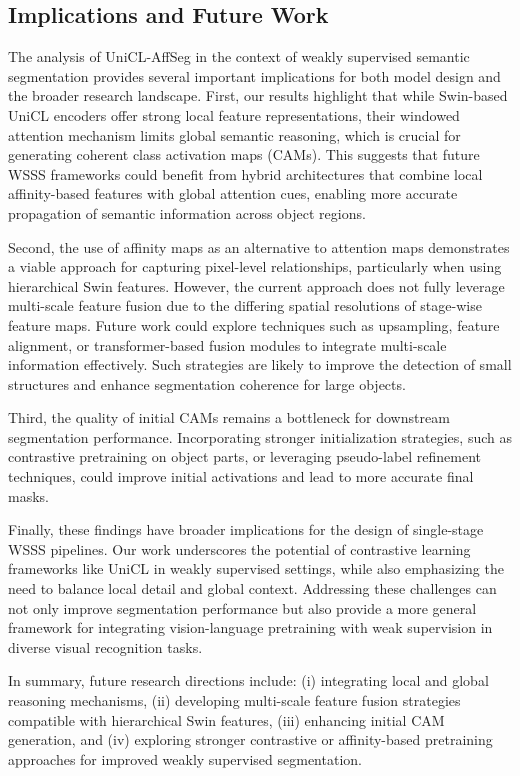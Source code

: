
\subsection{Implications and Future Work}
\label{subsec:implications_and_future_work}
The analysis of UniCL-AffSeg  in the context of weakly supervised semantic segmentation provides several important implications for both model design and the broader research landscape. First, our results highlight that while Swin-based UniCL encoders offer strong local feature representations, their windowed attention mechanism limits global semantic reasoning, which is crucial for generating coherent class activation maps (CAMs). This suggests that future WSSS frameworks could benefit from hybrid architectures that combine local affinity-based features with global attention cues, enabling more accurate propagation of semantic information across object regions.  

Second, the use of affinity maps as an alternative to attention maps demonstrates a viable approach for capturing pixel-level relationships, particularly when using hierarchical Swin features. However, the current approach does not fully leverage multi-scale feature fusion due to the differing spatial resolutions of stage-wise feature maps. Future work could explore techniques such as upsampling, feature alignment, or transformer-based fusion modules to integrate multi-scale information effectively. Such strategies are likely to improve the detection of small structures and enhance segmentation coherence for large objects.  

Third, the quality of initial CAMs remains a bottleneck for downstream segmentation performance. Incorporating stronger initialization strategies, such as contrastive pretraining on object parts, or leveraging pseudo-label refinement techniques, could improve initial activations and lead to more accurate final masks.  

Finally, these findings have broader implications for the design of single-stage WSSS pipelines. Our work underscores the potential of contrastive learning frameworks like UniCL in weakly supervised settings, while also emphasizing the need to balance local detail and global context. Addressing these challenges can not only improve segmentation performance but also provide a more general framework for integrating vision-language pretraining with weak supervision in diverse visual recognition tasks.  

In summary, future research directions include: (i) integrating local and global reasoning mechanisms, (ii) developing multi-scale feature fusion strategies compatible with hierarchical Swin features, (iii) enhancing initial CAM generation, and (iv) exploring stronger contrastive or affinity-based pretraining approaches for improved weakly supervised segmentation.
